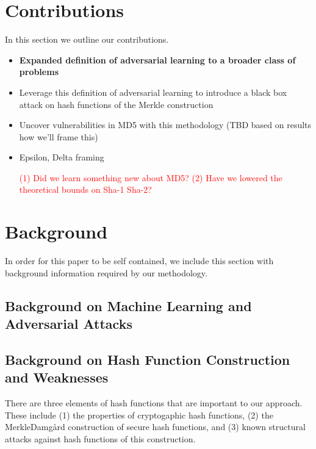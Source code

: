 \section{Contributions}
In this section we outline our contributions. 

\begin{itemize}
\item \textbf{Expanded definition of adversarial learning to a broader class of problems} 
\item Leverage this definition of adversarial learning to introduce a black box attack on hash functions of the Merkle construction 
\item Uncover vulnerabilities in MD5 with this methodology (TBD based on results how we'll frame this) 
\item Epsilon, Delta framing 

\textcolor{red}{(1) Did we learn something new about MD5? (2) Have we lowered the theoretical bounds on Sha-1 Sha-2?}
\end{itemize}

\section{Background}
In order for this paper to be self contained, we include this section with background information required by our methodology. 
\subsection{Background on Machine Learning and Adversarial Attacks} 

\subsection{Background on Hash Function Construction and Weaknesses} 
There are three elements of hash functions that are important to our approach. These include (1) the properties of cryptogaphic hash functions, (2) the Merkle{\textendash}Damg\r{a}rd construction of secure hash functions, and (3) known structural attacks against hash functions of this construction. 

